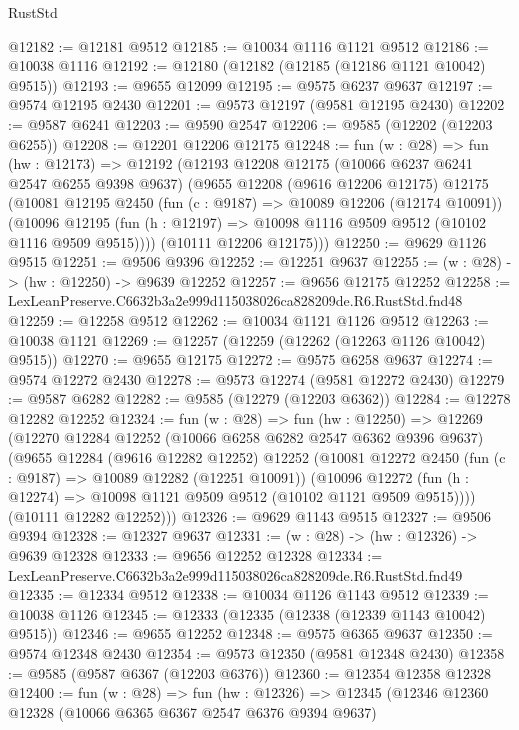 \begin{lexlean}{RustStd}
\begin{coremodule}
@12182 := @12181 @9512
@12185 := @10034 @1116 @1121 @9512
@12186 := @10038 @1116
@12192 := @12180 (@12182 (@12185 (@12186 @1121 @10042) @9515))
@12193 := @9655 @12099
@12195 := @9575 @6237 @9637
@12197 := @9574 @12195 @2430
@12201 := @9573 @12197 (@9581 @12195 @2430)
@12202 := @9587 @6241
@12203 := @9590 @2547
@12206 := @9585 (@12202 (@12203 @6255))
@12208 := @12201 @12206 @12175
@12248 := fun (w : @28) =>
  fun (hw : @12173) =>
  @12192
    (@12193
      @12208
      @12175
      (@10066 @6237 @6241 @2547 @6255 @9398 @9637)
      (@9655
        @12208
        (@9616 @12206 @12175)
        @12175
        (@10081
          @12195
          @2450
          (fun (c : @9187) => @10089 @12206 (@12174 @10091))
          (@10096 @12195 (fun (h : @12197) => @10098 @1116 @9509 @9512 (@10102 @1116 @9509 @9515))))
        (@10111 @12206 @12175)))
@12250 := @9629 @1126 @9515
@12251 := @9506 @9396
@12252 := @12251 @9637
@12255 := (w : @28) -> (hw : @12250) -> @9639 @12252
@12257 := @9656 @12175 @12252
@12258 := LexLeanPreserve.C6632b3a2e999d115038026ca828209de.R6.RustStd.fnd48
@12259 := @12258 @9512
@12262 := @10034 @1121 @1126 @9512
@12263 := @10038 @1121
@12269 := @12257 (@12259 (@12262 (@12263 @1126 @10042) @9515))
@12270 := @9655 @12175
@12272 := @9575 @6258 @9637
@12274 := @9574 @12272 @2430
@12278 := @9573 @12274 (@9581 @12272 @2430)
@12279 := @9587 @6282
@12282 := @9585 (@12279 (@12203 @6362))
@12284 := @12278 @12282 @12252
@12324 := fun (w : @28) =>
  fun (hw : @12250) =>
  @12269
    (@12270
      @12284
      @12252
      (@10066 @6258 @6282 @2547 @6362 @9396 @9637)
      (@9655
        @12284
        (@9616 @12282 @12252)
        @12252
        (@10081
          @12272
          @2450
          (fun (c : @9187) => @10089 @12282 (@12251 @10091))
          (@10096 @12272 (fun (h : @12274) => @10098 @1121 @9509 @9512 (@10102 @1121 @9509 @9515))))
        (@10111 @12282 @12252)))
@12326 := @9629 @1143 @9515
@12327 := @9506 @9394
@12328 := @12327 @9637
@12331 := (w : @28) -> (hw : @12326) -> @9639 @12328
@12333 := @9656 @12252 @12328
@12334 := LexLeanPreserve.C6632b3a2e999d115038026ca828209de.R6.RustStd.fnd49
@12335 := @12334 @9512
@12338 := @10034 @1126 @1143 @9512
@12339 := @10038 @1126
@12345 := @12333 (@12335 (@12338 (@12339 @1143 @10042) @9515))
@12346 := @9655 @12252
@12348 := @9575 @6365 @9637
@12350 := @9574 @12348 @2430
@12354 := @9573 @12350 (@9581 @12348 @2430)
@12358 := @9585 (@9587 @6367 (@12203 @6376))
@12360 := @12354 @12358 @12328
@12400 := fun (w : @28) =>
  fun (hw : @12326) =>
  @12345
    (@12346
      @12360
      @12328
      (@10066 @6365 @6367 @2547 @6376 @9394 @9637)

\end{coremodule}
\end{lexlean}
